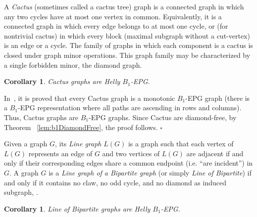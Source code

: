 \documentclass[9pt]{entcs}
\newtheorem{coro}[thm]{Corollary}%
\begin{document}

A \textit{Cactus} (sometimes called a cactus tree)  graph is a connected graph in which any two  cycles have at most one vertex in common. Equivalently, it is a connected graph in which every edge belongs to at most one  cycle, or (for nontrivial cactus) in which every block (maximal subgraph without a cut-vertex) is an edge or a cycle. The family of graphs in which each component is a cactus is closed under graph minor operations. This graph family may be characterized by a single forbidden minor, the diamond graph.
 
 
 
\begin{coro}
Cactus graphs are  Helly $B_1$-EPG.
\end{coro}
\begin{pf}
In~\cite{cela2019monotonic}, it is proved that every Cactus graph is a monotonic $B_1$-EPG graph 
(there is a $B_1$-EPG representation where all paths are ascending in rows and columns). 
Thus, Cactus graphs are $B_1$-EPG graphs. 
Since Cactus are diamond-free, by Theorem ~\ref{lem:b1DiamondFree}, the proof follows.
$\square$\end{pf}

Given a graph $G$, its \textit{Line graph} $L(G)$ is a graph such that each vertex of $L(G)$ represents an edge of $G$ and
  two vertices of $L(G)$ are adjacent if and only if their corresponding edges share a common endpoint (i.e. ``are incident'') in $G$.  
A graph $G$ is a \textit{Line graph of a Bipartite graph} (or simply \textit{Line of Bipartite}) if and only if it
contains no claw, no odd cycle, and no diamond as induced subgraph, \cite{harary1974line}.



\begin{coro}\label{coro:lineOfBipartite}
 Line of Bipartite graphs are Helly $B_1$-EPG. 
\end{coro}
\end{document}
